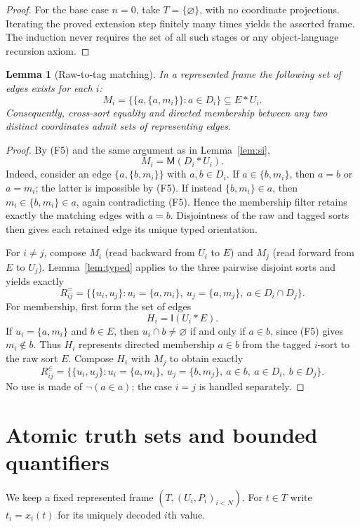 \documentclass[11pt,a4paper]{article}
\numberwithin{equation}{section}
\newtheorem{lemma}[theorem]{Lemma}
\newcommand{\up}[2]{\{#1,#2\}}
\newcommand{\UnProd}{\mathbin{\ast}}
\newcommand{\Int}{\mathsf{I}}
\newcommand{\Mem}{\mathsf{M}}
\begin{document}
\begin{proof}
For the base case $n=0$, take $T=\{\varnothing\}$, with no coordinate projections.  Iterating the proved extension step finitely many times yields the asserted frame.  The induction never requires the set of all such stages or any object-language recursion axiom.
\end{proof}

\begin{lemma}[Raw-to-tag matching]\label{lem:matching}
In a represented frame the following set of edges exists for each $i$:
\[
M_i=\{\up a{\up a{m_i}}:a\in D_i\}\subseteq E\UnProd U_i.
\]
Consequently, cross-sort equality and directed membership between any two \emph{distinct} coordinates admit sets of representing edges.
\end{lemma}
\begin{proof}
By (F5) and the same argument as in Lemma~\ref{lem:si},
\[
M_i=\Mem(D_i\UnProd U_i).
\]
Indeed, consider an edge $\up a{\up b{m_i}}$ with $a,b\in D_i$.  If $a\in\up b{m_i}$, then $a=b$ or $a=m_i$; the latter is impossible by (F5).  If instead $\up b{m_i}\in a$, then $m_i\in\up b{m_i}\in a$, again contradicting (F5).  Hence the membership filter retains exactly the matching edges with $a=b$.  Disjointness of the raw and tagged sorts then gives each retained edge its unique typed orientation.

For $i\ne j$, compose $M_i$ (read backward from $U_i$ to $E$) and $M_j$ (read forward from $E$ to $U_j$).  Lemma~\ref{lem:typed} applies to the three pairwise disjoint sorts and yields exactly
\begin{equation}\label{eq:eqedge}
R_{ij}^{=} =\bigl\{\up{u_i}{u_j}:u_i=\up a{m_i},\ u_j=\up a{m_j},\ a\in D_i\cap D_j\bigr\}.
\end{equation}
For membership, first form the set of edges
\[
H_i=\Int(U_i\UnProd E).
\]
If $u_i=\up a{m_i}$ and $b\in E$, then $u_i\cap b\ne\varnothing$ if and only if $a\in b$, since (F5) gives $m_i\notin b$.  Thus $H_i$ represents directed membership $a\in b$ from the tagged $i$-sort to the raw sort $E$.  Compose $H_i$ with $M_j$ to obtain exactly
\begin{equation}\label{eq:inedge}
R_{ij}^{\in}=\bigl\{\up{u_i}{u_j}:u_i=\up a{m_i},\ u_j=\up b{m_j},\ a\in b,\ a\in D_i,\ b\in D_j\bigr\}.
\end{equation}
No use is made of $\neg(a\in a)$; the case $i=j$ is handled separately.
\end{proof}

\section{Atomic truth sets and bounded quantifiers}\label{sec:truth}
We keep a fixed represented frame $(T,(U_i,P_i)_{i<N})$.  For $t\in T$ write $t_i=x_i(t)$ for its uniquely decoded $i$th value.
\end{document}
